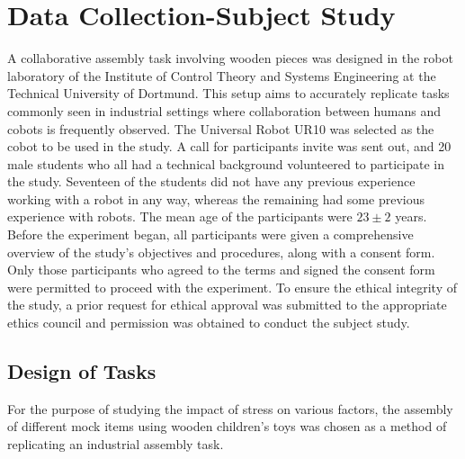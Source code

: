 \chapter{Data Collection-Subject Study}

A collaborative assembly task involving wooden pieces was designed in the robot laboratory of the Institute of Control Theory and Systems Engineering at the Technical University of Dortmund. This setup aims to accurately replicate tasks commonly seen in industrial settings where collaboration between humans and cobots is frequently observed. The Universal Robot UR10 was selected as the cobot to be used in the study. A call for participants invite was sent out, and 20 male students who all had a technical background volunteered to participate in the study. Seventeen of the students did not have any previous experience working with a robot in any way, whereas the remaining
had some previous experience with robots. The mean age of the participants were $23 \pm 2$ years. Before the experiment began, all participants were given a comprehensive overview of the study's objectives and procedures, along with a consent form. Only those participants who agreed to the terms and signed the consent form were permitted to proceed with the experiment. To ensure the ethical integrity of the study, a prior request for ethical approval was submitted to the appropriate ethics council and permission was obtained to conduct the subject study.

\section{Design of Tasks}
For the purpose of studying the impact of stress on various factors, the assembly of different mock items using wooden children's toys was chosen as a method of replicating an industrial assembly task.

